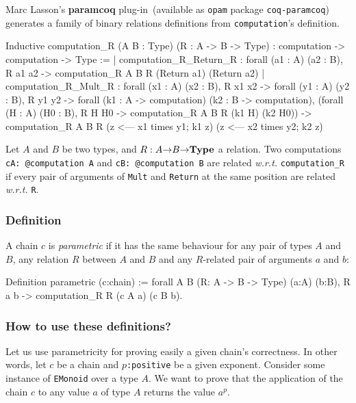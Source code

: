 Marc Lasson's \textbf{paramcoq} plug-in~(available as  \texttt{opam} package 
\texttt{coq-paramcoq}) generates  a family of binary relations definitions
from \texttt{computation}'s definition.

\begin{Coqanswer}
Inductive
computation_R (A B : Type) (R : A -> B -> Type)
  : computation -> computation -> Type :=
 |    computation_R_Return_R : 
       forall (a1 : A) (a2 : B),  R a1 a2 ->
         computation_R A B R (Return a1) (Return a2)
  | computation_R_Mult_R : forall (x1 : A) (x2 : B),
         R x1 x2 ->
          forall (y1 : A) (y2 : B),
            R y1 y2 ->
            forall (k1 : A -> computation)
                   (k2 : B -> computation),
                      (forall (H : A) (H0 : B),
                          R H H0 -> 
                          computation_R A B R (k1 H) (k2 H0)) ->
                       computation_R A  B R 
                          (z <--- x1 times y1; k1 z)
                          (z <--- x2 times y2; k2 z)
\end{Coqanswer}


Let $A$ and $B$  be two types, and $R: A \mbox{$\rightarrow$} B \mbox{$\rightarrow$} \textbf{Type}$ 
a relation.
Two computations \texttt{cA: @computation A} and \texttt{cB: @computation B}
are related \emph{w.r.t.} \texttt{computation\_R} if every pair of 
arguments of \texttt{Mult} and \texttt{Return} at the same position 
are related \emph{w.r.t.} \texttt{R}.


\subsubsection{Definition}
A chain $c$ is \emph{parametric} if it has the same behaviour for any
pair of types $A$  and $B$, any relation $R$
between  $A$ and $B$ and any $R$-related pair of 
arguments $a$ and $b$:

\begin{Coqsrc}
Definition parametric (c:chain) :=
  forall A B (R: A -> B -> Type) (a:A) (b:B),
   R a b -> computation_R  R (c A a) (c B b).
\end{Coqsrc}

\subsubsection{How to use these definitions?}
Let us use parametricity for proving easily 
a given chain's correctness.
In other words, 
let $c$ be a chain and \texttt{$p$:positive} be a given exponent.
Consider some instance of \texttt{EMonoid} over a type $A$.
We want to prove that the application of the chain $c$ to 
any value $a$ of type $A$ returns the value \texttt{$a^p$}.

